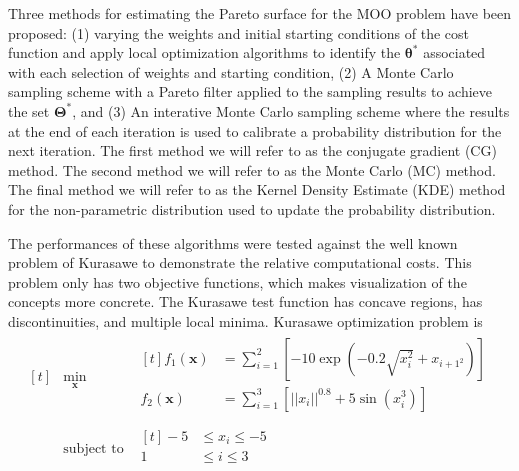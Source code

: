 Three methods for estimating the Pareto surface for the MOO problem have been proposed: (1) varying the weights and initial starting conditions of the cost function and apply local optimization algorithms to identify the $\bm{\theta}^*$ associated with each selection of weights and starting condition, (2) A Monte Carlo sampling scheme with a Pareto filter applied to the sampling results to achieve the set $\bm{\Theta}^*$, and (3) An interative Monte Carlo sampling scheme where the results at the end of each iteration is used to calibrate a probability distribution for the next iteration.  The first method we will refer to as the conjugate gradient (CG) method.  The second method we will refer to as the Monte Carlo (MC) method.  The final method we will refer to as the Kernel Density Estimate (KDE) method for the non-parametric distribution used to update the probability distribution.

 The performances of these algorithms were tested against the well known problem of Kurasawe\cite{kursawe1991_pareto} to demonstrate the relative computational costs.  This problem only has two objective functions, which makes visualization of the concepts more concrete.  The Kurasawe test function has concave regions, has discontinuities, and multiple local minima.  Kurasawe optimization problem is
 \begin{equation}
 \begin{aligned}[t]
   &\min_{\bm{x}}
     &\begin{aligned}[t]
       f_1(\bm{x}) &= \sum_{i=1}^2
           \left[
             -10 \exp\left(-0.2 \sqrt{x_i^2} + x_{i+1^2}\right)
           \right] \\
       f_2(\bm{x}) &= \sum_{i=1}^3 \left[ \vert|x_{i} \vert|^{0.8} + 5\sin(x_i^3)\right] \\
     \end{aligned}
   \\
   &\text{subject to}
     &\begin{aligned}[t]
 		      -5 &\leq x_i \leq -5 \\
       		 1 &\leq i   \leq  3 \\
     \end{aligned}
   \end{aligned}
 \end{equation}

